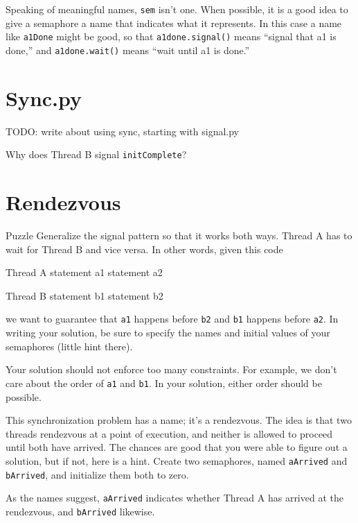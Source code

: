 Speaking of meaningful names, {\tt sem} isn't one.  When
possible, it is a good idea to give a semaphore a name
that indicates what it represents.  In this case a name like
{\tt a1Done} might be good, so that {\tt a1done.signal()} means
``signal that a1 is done,'' and {\tt a1done.wait()} means
``wait until a1 is done.''


\section{Sync.py}
\label{sync.py}

TODO: write about using sync, starting with signal.py

Why does Thread B signal {\tt initComplete}?


\section{Rendezvous}
\label{rendezvous}

\begin{puzzlebox}{Puzzle}
Generalize the signal pattern so that it works both
ways.  Thread A has to wait for Thread B and vice versa.  In other
words, given this code

\begin{lsthalfbox}[before skip=0.6em]{Thread A}
statement a1
statement a2
\end{lsthalfbox}
\begin{lsthalfbox}[after skip=0.6em]{Thread B}
statement b1
statement b2
\end{lsthalfbox}

we want to guarantee that {\tt a1} happens before {\tt b2} and
{\tt b1} happens before {\tt a2}.  In writing your solution, be sure
to specify the names and initial values of your semaphores
(little hint there).

Your solution should not enforce too many constraints.  For example,
we don't care about the order of {\tt a1} and {\tt b1}.  In your
solution, either order should be possible.

This synchronization problem has a name; it's a
rendezvous.  The idea is that two threads rendezvous
at a point of execution, and neither is allowed to proceed
until both have arrived.
The chances are good that you were able to figure out a solution,
but if not, here is a hint.  Create two semaphores, named {\tt aArrived}
and {\tt bArrived}, and initialize them both to zero.

As the names suggest, {\tt aArrived} indicates whether Thread A
has arrived at the rendezvous, and {\tt bArrived} likewise.
\end{puzzlebox}


